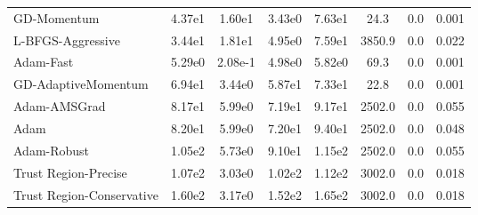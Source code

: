\documentclass{article}
\begin{document}
\begin{table}[htbp]
{\begin{tabular}{p{2.5cm}*{7}{c}}
GD-Momentum & 4.37e1 & 1.60e1 & 3.43e0 & 7.63e1 & 24.3 & 0.0 & 0.001 \\
L-BFGS-Aggressive & 3.44e1 & 1.81e1 & 4.95e0 & 7.59e1 & 3850.9 & 0.0 & 0.022 \\
Adam-Fast & 5.29e0 & 2.08e-1 & 4.98e0 & 5.82e0 & 69.3 & 0.0 & 0.001 \\
GD-AdaptiveMomentum & 6.94e1 & 3.44e0 & 5.87e1 & 7.33e1 & 22.8 & 0.0 & 0.001 \\
Adam-AMSGrad & 8.17e1 & 5.99e0 & 7.19e1 & 9.17e1 & 2502.0 & 0.0 & 0.055 \\
Adam & 8.20e1 & 5.99e0 & 7.20e1 & 9.40e1 & 2502.0 & 0.0 & 0.048 \\
Adam-Robust & 1.05e2 & 5.73e0 & 9.10e1 & 1.15e2 & 2502.0 & 0.0 & 0.055 \\
Trust Region-Precise & 1.07e2 & 3.03e0 & 1.02e2 & 1.12e2 & 3002.0 & 0.0 & 0.018 \\
Trust Region-Conservative & 1.60e2 & 3.17e0 & 1.52e2 & 1.65e2 & 3002.0 & 0.0 & 0.018 \\
\bottomrule
\end{tabular}
}
\end{table}
\end{document}
